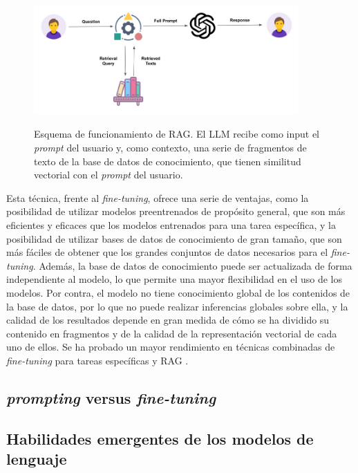 \begin{figure}[H]
    \caption[Esquema de funcionamiento de RAG]{Esquema de funcionamiento de RAG. El LLM recibe como input el \textit{prompt} del usuario y, como contexto, una serie de fragmentos de texto de la base de datos de conocimiento, que tienen similitud vectorial con el \textit{prompt} del usuario.}
    \centering
    \includegraphics[width=0.9\textwidth]{./figuras/rag.png}
    \label{fig:rag}
\end{figure}

Esta técnica, frente al \textit{fine-tuning}, ofrece una serie de ventajas, como la posibilidad de utilizar modelos preentrenados de propósito general, que son más eficientes y eficaces que los modelos entrenados para una tarea específica, y la posibilidad de utilizar bases de datos de conocimiento de gran tamaño, que son más fáciles de obtener que los grandes conjuntos de datos necesarios para el \textit{fine-tuning}. Además, la base de datos de conocimiento puede ser actualizada de forma independiente al modelo, lo que permite una mayor flexibilidad en el uso de los modelos. Por contra, el modelo no tiene conocimiento global de los contenidos de la base de datos, por lo que no puede realizar inferencias globales sobre ella, y la calidad de los resultados depende en gran medida de cómo se ha dividido su contenido en fragmentos y de la calidad de la representación vectorial de cada uno de ellos. Se ha probado un mayor rendimiento en técnicas combinadas de \textit{fine-tuning} para tareas específicas y RAG \citep{lewisRetrievalAugmentedGenerationKnowledgeIntensive2021}.


\subsection{\textit{prompting} versus \textit{fine-tuning}}

\subsection{Habilidades emergentes de los modelos de lenguaje}

